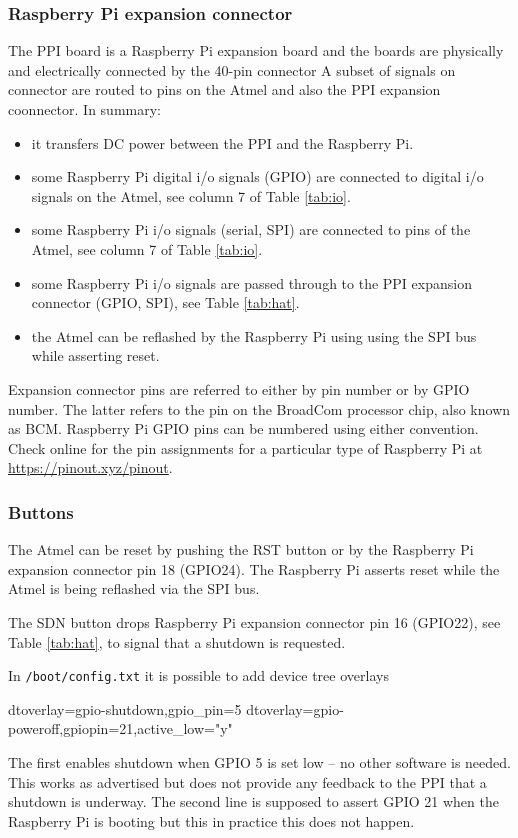 \documentclass[11pt,fleqn]{article}
\begin{document}
\subsubsection{Raspberry Pi expansion connector}
The PPI board is a Raspberry Pi expansion board and the boards are physically and electrically connected by the 40-pin connector
A subset of signals on connector are routed to pins on the Atmel and also the PPI  expansion coonnector.
In summary:
\begin{itemize}
\item it transfers DC power between the PPI and the Raspberry Pi.
\item some Raspberry Pi digital i/o signals (GPIO) are connected to digital i/o signals on the Atmel, see column 7 of Table \ref{tab:io}.
\item some Raspberry Pi  i/o signals (serial, SPI) are connected to pins of the Atmel, see column 7 of Table \ref{tab:io}.
\item some Raspberry Pi i/o signals are passed through to the PPI expansion connector (GPIO, SPI), see Table \ref{tab:hat}.
\item the Atmel can be reflashed by the Raspberry Pi using using the SPI bus while asserting reset.
\end{itemize}

Expansion connector pins are referred to either by pin number or by GPIO number.
The latter refers to the pin on the
BroadCom processor chip, also known as BCM.  Raspberry Pi GPIO pins can be numbered using either convention.
Check online for the pin assignments for a particular type of Raspberry Pi at \url{https://pinout.xyz/pinout}.


\subsubsection{Buttons}
The Atmel can be reset by pushing the RST button or by the Raspberry Pi expansion connector pin 18 (GPIO24).  The Raspberry Pi asserts reset while the Atmel
is being reflashed via the SPI bus.

The SDN button drops Raspberry Pi expansion connector pin 16 (GPIO22), see Table \ref{tab:hat}, to signal that a shutdown is requested.

In \texttt{/boot/config.txt} it is possible to add device tree overlays
\begin{Code}
dtoverlay=gpio-shutdown,gpio_pin=5
dtoverlay=gpio-poweroff,gpiopin=21,active_low="y"
\end{Code}
The first enables shutdown when GPIO 5 is set low -- no other software is needed.  This works as advertised but does not
provide any feedback to the PPI that a shutdown is underway.
The second line is supposed to assert GPIO 21 when the Raspberry Pi is booting but this in practice this does not happen.
\end{document}
